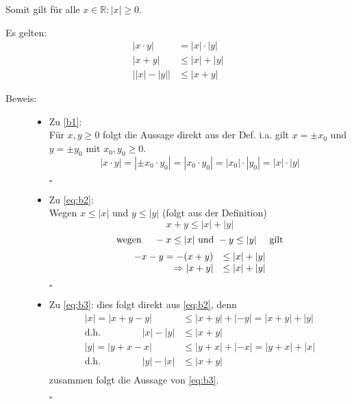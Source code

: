 \documentclass[12pt,a4paper,leqno]{article}
\begin{document}
  
  Somit gilt für alle $x \in \mathbb{R}: |x| \geq 0$.
  
  Es gelten:
  \renewcommand{\theequation}{B\arabic{equation}}
  \setcounter{equation}{0}
  \begin{align}
    \label{b1} |x \cdot y| &= |x| \cdot |y| \\
    \label{b2} |x+y| &\leq |x|+|y| \\  
    \label{b3} \big||x|-|y|\big| &\leq |x+y|
  \end{align}
  
  \begin{description}
    
    \item[Beweis:] \hfill
      
      \begin{itemize}
        \item[] Zu \eqref{b1}: \\
          Für $x, y \geq 0$ folgt die Aussage direkt aus der Def. i.a. gilt $x = \pm x_0$ und $y = \pm y_0$ mit $x_0, y_0 \geq 0$.
          $$|x\cdot y| =  |\pm x_0\cdot y_0 | = |x_0 \cdot y_0| = |x_0|\cdot|y_0|=|x|\cdot|y|$$
          \begin{flushright}$\square$\end{flushright}
          
        \item[] Zu \eqref{eq:b2}: \\
          Wegen $ x \leq |x|$ und $y \leq |y|$ (folgt aus der Definition)
          $$x + y \leq |x| + |y|$$
          $$\textrm{wegen } \quad -x \leq |x| \\ \textrm{ und } -y \leq |y| \quad \textrm{ gilt}$$
          $$\begin{array}{r l}
            -x - y = -(x+y)  &\leq |x| + |y| \\
            \Rightarrow |x + y| &\leq |x| + |y| 
          \end{array}$$
          \begin{flushright}$\square$\end{flushright}
          
          
        \item[] Zu \eqref{eq:b3}: dies folgt direkt aus \eqref{eq:b2}, denn  
          \begin{align*}
            |x| = |x+y-y| &\leq |x+y|+|-y| = |x + y| + |y| \\
            \textrm{d.h. } \qquad \qquad |x|-|y| &\leq |x+y| \\
            |y| = |y + x - x| &\leq |y + x| + |-x| = |y + x| + |x| \\
            \textrm{d.h. } \qquad \qquad |y|-|x| &\leq |x+y| \\
          \end{align*}
          zusammen folgt die Aussage von \eqref{eq:b3}.
          \begin{flushright}$\square$\end{flushright}
          
          
      \end{itemize}
  \end{description}
  
\end{document}
